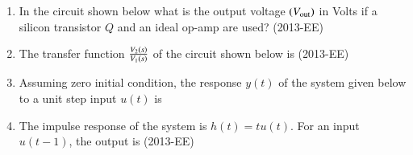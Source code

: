 \documentclass[journal]{IEEEtran}
\begin{document}
\begin{enumerate}
    \item In the circuit shown below what is the output voltage $\left(V_{\text{out}}\right)$ in Volts if a silicon transistor $Q$ and an ideal op-amp are used? \hfill(2013-EE)
    
    \begin{enumerate}
    \end{enumerate}
    \item The transfer function $\frac{V_2\left(s\right)}{V_1\left(s\right)}$ of the circuit shown below is \hfill(2013-EE) 
    
    \begin{enumerate}
    \end{enumerate}
    \item Assuming zero initial condition, the response $y(t)$ of the system given below to a unit step input $u(t)$ is 
    
    \begin{enumerate}
    \end{enumerate}
    \item The impulse response of the system is $h(t) = t u(t)$. For an input $u(t-1)$, the output is \hfill(2013-EE)
    \begin{enumerate}
\end{enumerate}
\end{enumerate}
\end{document}
